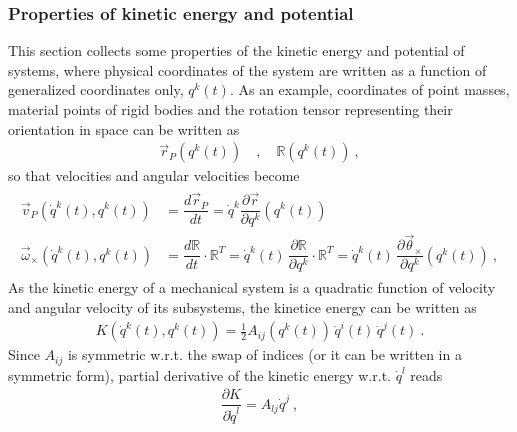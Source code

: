 \documentclass[letterpaper,10pt,english]{jupyterBook}
\begin{document}
\subsubsection{Properties of kinetic energy and potential}
\label{\detokenize{ch/lagrange-t-no:properties-of-kinetic-energy-and-potential}}
\sphinxAtStartPar
This section collects some properties of the kinetic energy and potential of systems, where physical coordinates of the system are written as a function of generalized coordinates only, \(q^k(t)\). As an example, coordinates of point masses, material points of rigid bodies and the rotation tensor representing their orientation in space can be written as
\begin{equation*}
\begin{split}\vec{r}_P\left(q^k(t)\right) \quad , \quad \mathbb{R} \left( q^k(t) \right) \ ,\end{split}
\end{equation*}
\sphinxAtStartPar
so that velocities and angular velocities become
\begin{equation*}
\begin{split}\begin{aligned}
  \vec{v}_P\left(\dot{q}^k(t), q^k(t)\right) & = \dfrac{d \vec{r}_P}{dt} = \dot{q}^k \dfrac{\partial \vec{r}}{\partial q^k}\left(q^k(t)\right) \\ 
  \vec{\omega}_{\times}\left(\dot{q}^k(t), q^k(t)\right) & = \dfrac{d \mathbb{R}}{d t} \cdot \mathbb{R}^T = \dot{q}^k(t) \, \dfrac{\partial \mathbb{R}}{\partial q^k} \cdot \mathbb{R}^T = \dot{q}^k(t) \, \dfrac{\partial \vec{\theta}_{\times}}{\partial q^k}\left(q^k(t)\right) \ ,
\end{aligned}\end{split}
\end{equation*}
\sphinxAtStartPar
As the kinetic energy of a mechanical system is a quadratic function of velocity and angular velocity of its sub\sphinxhyphen{}systems, the kinetice energy can be written as
\begin{equation*}
\begin{split}K\left( \dot{q}^k(t), q^k(t) \right) = \frac{1}{2} A_{ij}\left(q^k(t)\right) \, \dot{q}^i(t) \, \dot{q}^j(t) \ .\end{split}
\end{equation*}
\sphinxAtStartPar
Since \(A_{ij}\) is symmetric w.r.t. the swap of indices (or it can be written in a symmetric form), partial derivative of the kinetic energy w.r.t. \(\dot{q}^l\) reads
\begin{equation*}
\begin{split}\dfrac{\partial K}{\partial \dot{q}^l} = A_{lj} \dot{q}^j \ ,\end{split}
\end{equation*}
\end{document}
